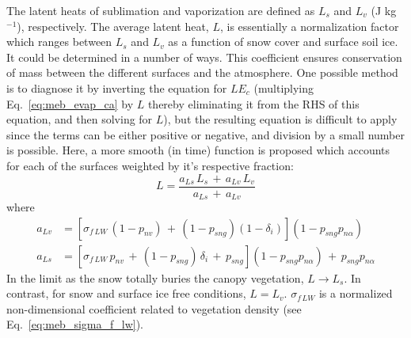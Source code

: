 The latent heats of sublimation and vaporization are defined as $L_s$ and $L_v$
(J kg$^{-1}$), respectively.
The average latent heat, ${L}$,
is essentially a normalization factor which ranges between $L_s$ and
$L_v$ as a function of snow cover and surface soil ice.
It could be determined in a number of ways.
This coefficient ensures conservation of mass between the different
surfaces and the atmosphere.
%
One possible method is to diagnose it 
by inverting the equation for $LE_c$
(multiplying Eq.~\ref{eq:meb_evap_ca} by $L$ thereby eliminating it from
the RHS of this equation, and then solving for $L$),
but the resulting equation is difficult to apply since the terms can be either
positive or negative, and division by a small number is possible.
Here, a more smooth (in time) function is proposed which accounts for
each of the surfaces weighted by it's respective fraction:
%
%
\begin{equation}
\label{eq:meb_latent_heat_avg_res}
{L} = {\frac{a_{Ls} \,L_s \,+\, a_{Lv} \,L_v}
{a_{Ls} \,+\, a_{Lv}}}
\end{equation}
%
where
%
\begin{subequations}
\begin{align}
a_{Lv} &= \left[ \sigma_{f\,LW} \, \left(1-p_{nv}\right) \,+\,
  \left(1-p_{sng}\right)\left(1-\delta_i\right) \right]
\left(1-p_{sng}p_{n\alpha}\right)
\\
a_{Ls} &= \left[ \sigma_{f\,LW} \, p_{nv} \,+\,
  \left(1-p_{sng}\right)\, \delta_i\,+\, p_{sng} \right]
\left(1-p_{sng}p_{n\alpha}\right)
 \,+\, p_{sng}p_{n\alpha}
%
\end{align}
\end{subequations}
%
In the limit as the snow totally buries the canopy vegetation, $L
\rightarrow L_s$. In contrast, for snow and surface ice free conditions, $L=L_v$.
$\sigma_{f\,LW}$ is a normalized non-dimensional coefficient 
related to vegetation density (see Eq.~\ref{eq:meb_sigma_f_lw}).


